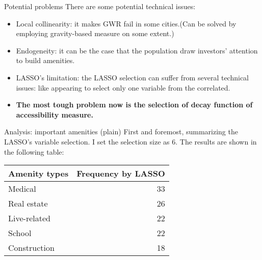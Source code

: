 \documentclass[aspectratio=169,xcolor=dvipsnames]{beamer}
\begin{document}
\begin{frame}{Potential problems}
	There are some potential technical issues:
	\begin{itemize}
		\item Local collinearity: it makes GWR fail in some cities.(Can be solved by employing gravity-based measure on some extent.)
		\item Endogeneity: it can be the case that the population draw investors' attention to build amenities.
		\item LASSO's limitation: the LASSO selection can suffer from several technical issues: like appearing to select only one variable from the correlated.
		\item \textbf{The most tough problem now is the selection of decay function of accessibility measure.}
	\end{itemize}
\end{frame}
\begin{frame}{Analysis: important amenities (plain)}
First and foremost, summarizing the LASSO's variable selection. I set the selection size as 6. The results are shown in the following table:
\begin{table}[]
	\begin{tabular}{lr}\toprule
		Amenity types & Frequency by LASSO \\
		\hline 
		Medical       & 33                 \\
		Real estate   & 26                 \\
		Live-related  & 22                 \\
		School        & 22                 \\
		Construction  & 18                \\\bottomrule
	\end{tabular}
\end{table}
\end{frame}
\end{document}
